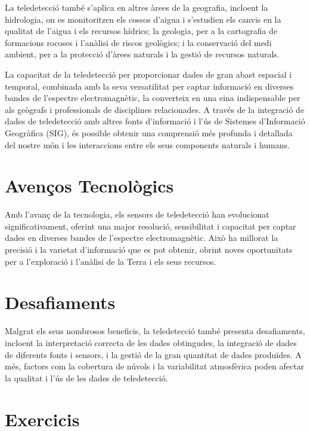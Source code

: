 \documentclass[
]{book}
\begin{document}
La teledetecció també s'aplica en altres àrees de la geografia, incloent la hidrologia, on es monitoritzen els cossos d'aigua i s'estudien els canvis en la qualitat de l'aigua i els recursos hídrics; la geologia, per a la cartografia de formacions rocoses i l'anàlisi de riscos geològics; i la conservació del medi ambient, per a la protecció d'àrees naturals i la gestió de recursos naturals.

La capacitat de la teledetecció per proporcionar dades de gran abast espacial i temporal, combinada amb la seva versatilitat per captar informació en diverses bandes de l'espectre electromagnètic, la converteix en una eina indispensable per als geògrafs i professionals de disciplines relacionades. A través de la integració de dades de teledetecció amb altres fonts d'informació i l'ús de Sistemes d'Informació Geogràfica (SIG), és possible obtenir una comprensió més profunda i detallada del nostre món i les interaccions entre els seus components naturals i humans.

\hypertarget{avenuxe7os-tecnoluxf2gics}{%
\section{Avenços Tecnològics}\label{avenuxe7os-tecnoluxf2gics}}

Amb l'avanç de la tecnologia, els sensors de teledetecció han evolucionat significativament, oferint una major resolució, sensibilitat i capacitat per captar dades en diverses bandes de l'espectre electromagnètic. Això ha millorat la precisió i la varietat d'informació que es pot obtenir, obrint noves oportunitats per a l'exploració i l'anàlisi de la Terra i els seus recursos.

\hypertarget{desafiaments}{%
\section{Desafiaments}\label{desafiaments}}

Malgrat els seus nombrosos beneficis, la teledetecció també presenta desafiaments, incloent la interpretació correcta de les dades obtingudes, la integració de dades de diferents fonts i sensors, i la gestió de la gran quantitat de dades produïdes. A més, factors com la cobertura de núvols i la variabilitat atmosfèrica poden afectar la qualitat i l'ús de les dades de teledetecció.

\hypertarget{exercicis-1}{%
\section{Exercicis}\label{exercicis-1}}
\end{document}

